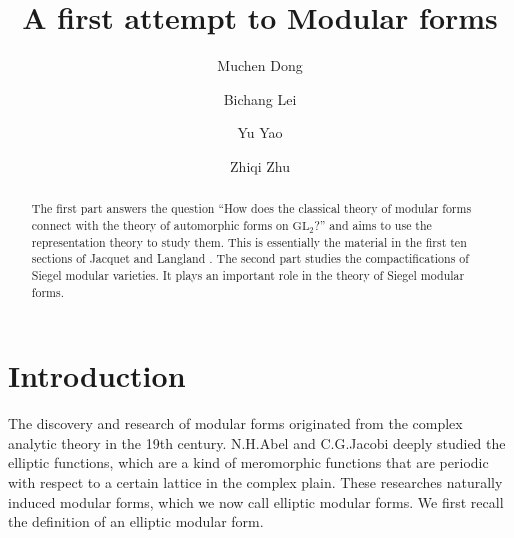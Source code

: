 \documentclass[11pt,english]{smfart}
\title[ModularForm]{A first attempt to Modular forms}%
\author[M. Dong]{Muchen Dong}
\author[B. Lei]{Bichang Lei}
\author[Y.Yao]{Yu Yao}
\author[Z. Zhu]{Zhiqi Zhu}
\theoremstyle{definition}
\theoremstyle{remark}
\begin{document}
\begin{abstract}
The first part answers the question ``How does the classical theory of modular forms connect with
the theory of automorphic forms on $\mathrm{GL_2}$?'' and aims to use the representation theory to study them. 
This is essentially the material in the first
ten sections of Jacquet and Langland \cite{JL70}.
The second part studies the compactifications of Siegel modular varieties. It plays an important role in the theory of Siegel modular forms.
\end{abstract}


\maketitle

\tableofcontents

\section{Introduction}
The discovery and research of modular forms originated from the complex analytic theory in the 19th century. N.H.Abel and C.G.Jacobi deeply studied the elliptic functions, which are a kind of meromorphic functions that are periodic with respect to a certain lattice in the complex plain. These researches naturally induced modular forms, which we now call elliptic modular forms. We first recall the definition of an elliptic modular form.
\end{document}
